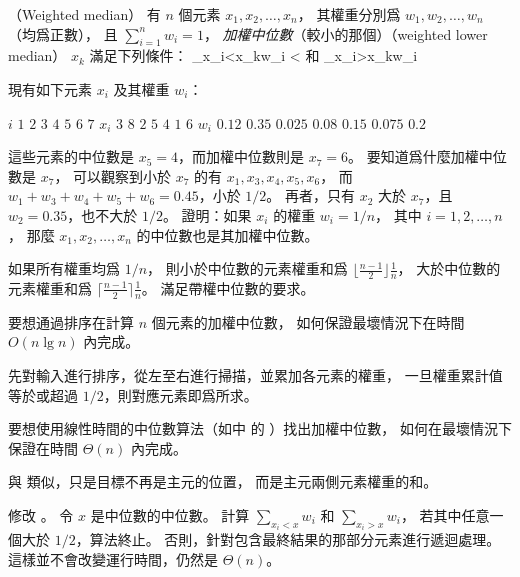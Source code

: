 \startPROBLEM
（Weighted median）
有 $n$ 個元素 $x_1,x_2,\ldots,x_n$，
其權重分別爲 $w_1,w_2,\ldots,w_n$ （均爲正數），
且 $\sum_{i=1}^{n}w_i=1$，
\emph{加權中位數}（較小的那個）（weighted lower median） $x_k$ 滿足下列條件：
\startformula
\sum_{x_i<x_k}w_i < 
\stopformula
和
\startformula
\sum_{x_i>x_k}w_i \le {}
\stopformula

現有如下元素 $x_i$ 及其權重 $w_i$：

\bTABLE
\bTR
\bTD $i$ \eTD\bTD $1$ \eTD\bTD $2$ \eTD\bTD $3$ \eTD\bTD $4$ \eTD\bTD $5$ \eTD\bTD $6$ \eTD\bTD $7$ \eTD
\eTR\bTR
\bTD $x_i$ \eTD\bTD $3$ \eTD\bTD $8$ \eTD\bTD $2$ \eTD\bTD $5$ \eTD\bTD $4$ \eTD\bTD $1$ \eTD\bTD $6$ \eTD
\eTR\bTR
\bTD $w_i$ \eTD\bTD $0.12$ \eTD\bTD $0.35$ \eTD\bTD $0.025$ \eTD\bTD $0.08$ \eTD\bTD $0.15$ \eTD\bTD $0.075$ \eTD\bTD $0.2$ \eTD
\eTR
\eTABLE

這些元素的中位數是 $x_5=4$，而加權中位數則是 $x_7=6$。
要知道爲什麼加權中位數是 $x_7$，
可以觀察到小於 $x_7$ 的有 $x_1,x_3,x_4,x_5,x_6$，
而 $w_1+w_3+w_4+w_5+w_6=0.45$，小於 $1/2$。
再者，只有 $x_2$ 大於 $x_7$，且 $w_2=0.35$，也不大於 $1/2$。
\startigBase[a]\startitem
證明：如果 $x_i$ 的權重 $w_i=1/n$，
其中 $i=1,2,\ldots,n$，
那麼 $x_1,x_2,\ldots,x_n$ 的中位數也是其加權中位數。
\stopitem\stopigBase

\startANSWER
如果所有權重均爲 $1/n$，
則小於中位數的元素權重和爲 $\lfloor \frac{n-1}{2}\rfloor \frac{1}{n}$，
大於中位數的元素權重和爲 $\lceil \frac{n-1}{2}\rceil \frac{1}{n}$。
滿足帶權中位數的要求。
\stopANSWER

\startigBase[continue]\startitem
要想通過排序在計算 $n$ 個元素的加權中位數，
如何保證最壞情況下在時間 $O(n\lg n)$ 內完成。
\stopitem\stopigBase

\startANSWER
先對輸入進行排序，從左至右進行掃描，並累加各元素的權重，
一旦權重累計值等於或超過 $1/2$，則對應元素即爲所求。
\stopANSWER

\startigBase[continue]\startitem
要想使用線性時間的中位數算法（如 中
的 ）找出加權中位數，
如何在最壞情況下保證在時間 $\Theta(n)$ 內完成。
\stopitem\stopigBase

\startANSWER
與  類似，只是目標不再是主元的位置，
而是主元兩側元素權重的和。

修改 。
令 $x$ 是中位數的中位數。
計算 $\sum_{x_i < x}w_i$ 和 $\sum_{x_i>x}w_i$，
若其中任意一個大於 $1/2$，算法終止。
否則，針對包含最終結果的那部分元素進行遞迴處理。
這樣並不會改變運行時間，仍然是 $\Theta(n)$。
\stopANSWER

